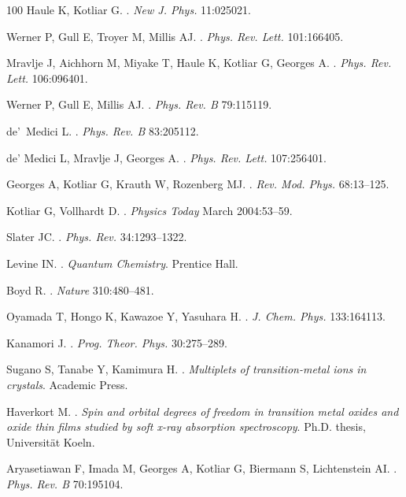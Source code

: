 \documentclass[]{ar2e-changed}%
\begin{document}
\begin{thebibliography}{100}
Haule K, Kotliar G.
.
\newblock \emph{New J. Phys.} 11:025021.

Werner P, Gull E, Troyer M, Millis AJ.
.
\newblock \emph{Phys. Rev. Lett.} 101:166405.

Mravlje J, Aichhorn M, Miyake T, Haule K, Kotliar G, Georges A.
.
\newblock \emph{Phys. Rev. Lett.} 106:096401.

Werner P, Gull E, Millis AJ.
.
\newblock \emph{Phys. Rev. B} 79:115119.

{de'~Medici} L.
.
\newblock \emph{Phys. Rev. B} 83:205112.

de' Medici L, Mravlje J, Georges A.
.
\newblock \emph{Phys. Rev. Lett.} 107:256401.

Georges A, Kotliar G, Krauth W, Rozenberg MJ.
.
\newblock \emph{Rev. Mod. Phys.} 68:13--125.

Kotliar G, Vollhardt D.
.
\newblock \emph{Physics Today} March 2004:53--59.

Slater JC.
.
\newblock \emph{Phys. Rev.} 34:1293--1322.

Levine IN.
.
\newblock \emph{Quantum Chemistry}.
\newblock Prentice Hall.

Boyd R.
.
\newblock \emph{Nature} 310:480--481.

Oyamada T, Hongo K, Kawazoe Y, Yasuhara H.
.
\newblock \emph{J. Chem. Phys.} 133:164113.

Kanamori J.
.
\newblock \emph{Prog. Theor. Phys.} 30:275--289.

Sugano S, Tanabe Y, Kamimura H.
.
\newblock \emph{Multiplets of transition-metal ions in crystals}.
\newblock Academic Press.

Haverkort M.
.
\newblock \emph{Spin and orbital degrees of freedom in transition metal oxides
  and oxide thin films studied by soft x-ray absorption spectroscopy}.
\newblock Ph.D. thesis, Universit\"{a}t Koeln.

Aryasetiawan F, Imada M, Georges A, Kotliar G, Biermann S, Lichtenstein AI.
.
\newblock \emph{Phys. Rev. B} 70:195104.


\end{thebibliography}
\end{document}
